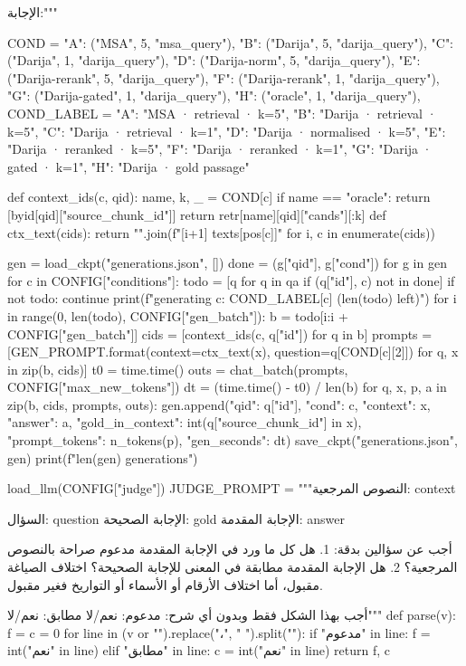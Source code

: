 {الإجابة:"""

COND = {
    "A": ("MSA", 5, "msa_query"),
    "B": ("Darija", 5, "darija_query"),
    "C": ("Darija", 1, "darija_query"),
    "D": ("Darija-norm", 5, "darija_query"),
    "E": ("Darija-rerank", 5, "darija_query"),
    "F": ("Darija-rerank", 1, "darija_query"),
    "G": ("Darija-gated", 1, "darija_query"),
    "H": ("oracle", 1, "darija_query"),
}
COND_LABEL = {"A": "MSA · retrieval · k=5", "B": "Darija · retrieval · k=5",
              "C": "Darija · retrieval · k=1", "D": "Darija · normalised · k=5",
              "E": "Darija · reranked · k=5", "F": "Darija · reranked · k=1",
              "G": "Darija · gated · k=1", "H": "Darija · gold passage"}

def context_ids(c, qid):
    name, k, _ = COND[c]
    if name == "oracle":
        return [byid[qid]["source_chunk_id"]]
    return retr[name][qid]["cands"][:k]
def ctx_text(cids): return "\n\n".join(f"[{i+1}] {texts[pos[c]]}" for i, c in enumerate(cids))

gen = load_ckpt("generations.json", [])
done = {(g["qid"], g["cond"]) for g in gen}
for c in CONFIG["conditions"]:
    todo = [q for q in qa if (q["id"], c) not in done]
    if not todo:
        continue
    print(f"generating {c}: {COND_LABEL[c]} ({len(todo)} left)")
    for i in range(0, len(todo), CONFIG["gen_batch"]):
        b = todo[i:i + CONFIG["gen_batch"]]
        cids = [context_ids(c, q["id"]) for q in b]
        prompts = [GEN_PROMPT.format(context=ctx_text(x), question=q[COND[c][2]]) for q, x in zip(b, cids)]
        t0 = time.time()
        outs = chat_batch(prompts, CONFIG["max_new_tokens"])
        dt = (time.time() - t0) / len(b)
        for q, x, p, a in zip(b, cids, prompts, outs):
            gen.append({"qid": q["id"], "cond": c, "context": x, "answer": a,
                        "gold_in_context": int(q["source_chunk_id"] in x),
                        "prompt_tokens": n_tokens(p), "gen_seconds": dt})
        save_ckpt("generations.json", gen)
print(f"{len(gen)} generations")

load_llm(CONFIG["judge"])
JUDGE_PROMPT = """النصوص المرجعية:
{context}

السؤال: {question}
الإجابة الصحيحة: {gold}
الإجابة المقدمة: {answer}

أجب عن سؤالين بدقة:
1. هل كل ما ورد في الإجابة المقدمة مدعوم صراحة بالنصوص المرجعية؟
2. هل الإجابة المقدمة مطابقة في المعنى للإجابة الصحيحة؟ اختلاف الصياغة مقبول، أما اختلاف الأرقام أو الأسماء أو التواريخ فغير مقبول.

أجب بهذا الشكل فقط وبدون أي شرح:
مدعوم: نعم/لا
مطابق: نعم/لا"""
def parse(v):
    f = c = 0
    for line in (v or "").replace("،", " ").split("\n"):
        if "مدعوم" in line: f = int("نعم" in line)
        elif "مطابق" in line: c = int("نعم" in line)
    return f, c

}
